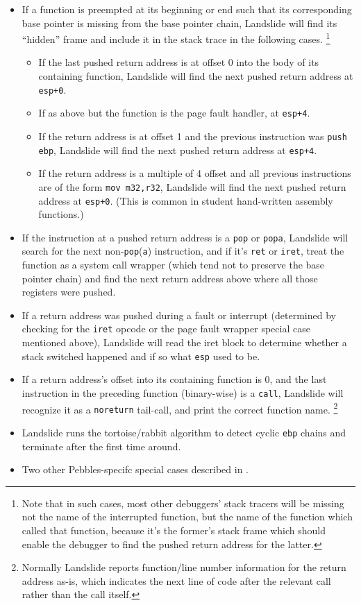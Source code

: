 \begin{itemize}
	\item If a function is preempted at its beginning or end
		such that its corresponding base pointer is missing from the base pointer chain,
		Landslide will find its ``hidden'' frame and include it in the stack trace in the following cases.%
		\footnote{Note that in such cases,
		most other debuggers' stack tracers will be missing not the name of the interrupted function,
		but the name of the function which called that function,
		because it's the former's stack frame which should enable the debugger
		to find the pushed return address for the latter.}
		\begin{itemize}
			\item If the last pushed return address is at offset 0 into the body of its containing function,
				Landslide will find the next pushed return address at {\tt esp+0}.
			\item If as above but the function is the page fault handler, at {\tt esp+4}.
			\item If the return address is at offset 1 and the previous instruction was {\tt push ebp},
				Landslide will find the next pushed return address at {\tt esp+4}.
			\item If the return address is a multiple of 4 offset
				and all previous instructions are of the form {\tt mov m32,r32},
				Landslide will find the next pushed return address at {\tt esp+0}.
				(This is common in student hand-written assembly functions.)
		\end{itemize}
	\item If the instruction at a pushed return address is a {\tt pop} or {\tt popa},
		Landslide will search for the next non-{\tt pop}({\tt a}) instruction,
		and if it's {\tt ret} or {\tt iret},
		treat the function as a system call wrapper
		(which tend not to preserve the base pointer chain)
		and find the next return address above where all those registers were pushed.
	\item If a return address was pushed during a fault or interrupt
		(determined by checking for the {\tt iret} opcode or the page fault wrapper special case mentioned above),
		Landslide will read the iret block to determine whether a stack switched happened
		and if so what {\tt esp} used to be.
	\item If a return address's offset into its containing function is 0,
		and the last instruction in the preceding function (binary-wise) is a {\tt call},
		Landslide will recognize it as a {\tt noreturn} tail-call, and print the correct function name.%
		\footnote{Normally Landslide reports function/line number information for the return address as-is,
		which indicates the next line of code after the relevant call rather than the call itself.}
	\item Landslide runs the tortoise/rabbit algorithm to detect cyclic {\tt ebp} chains and terminate after the first time around.
	\item Two other Pebbles-specifc special cases described in \sect{\ref{sec:landslide-pebblesspecifics}}.
\end{itemize}

